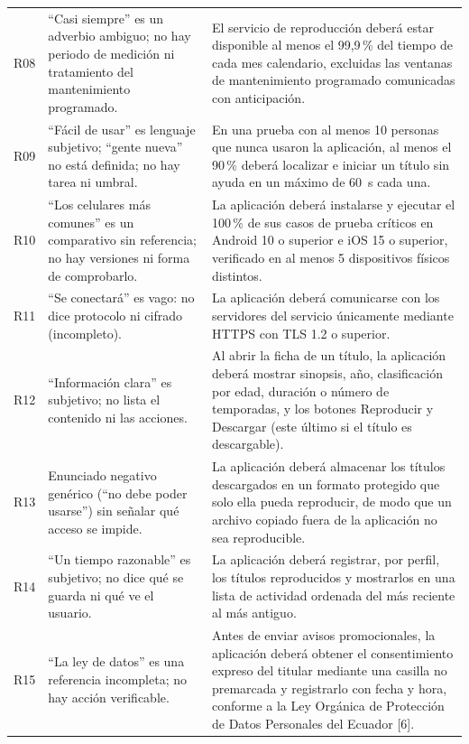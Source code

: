 \documentclass[11pt,a4paper]{article}
\begin{document}
\begin{longtable}{@{}p{0.9cm}p{4.9cm}p{9.4cm}@{}}
R08 & ``Casi siempre'' es un adverbio ambiguo; no hay periodo de medici\'on ni tratamiento del mantenimiento programado. & El servicio de reproducci\'on deber\'a estar disponible al menos el 99,9\,\% del tiempo de cada mes calendario, excluidas las ventanas de mantenimiento programado comunicadas con anticipaci\'on.\\
R09 & ``F\'acil de usar'' es lenguaje subjetivo; ``gente nueva'' no est\'a definida; no hay tarea ni umbral. & En una prueba con al menos 10 personas que nunca usaron la aplicaci\'on, al menos el 90\,\% deber\'a localizar e iniciar un t\'itulo sin ayuda en un m\'aximo de 60~s cada una.\\
R10 & ``Los celulares m\'as comunes'' es un comparativo sin referencia; no hay versiones ni forma de comprobarlo. & La aplicaci\'on deber\'a instalarse y ejecutar el 100\,\% de sus casos de prueba cr\'iticos en Android 10 o superior e iOS 15 o superior, verificado en al menos 5 dispositivos f\'isicos distintos.\\
R11 & ``Se conectar\'a'' es vago: no dice protocolo ni cifrado (incompleto). & La aplicaci\'on deber\'a comunicarse con los servidores del servicio \'unicamente mediante HTTPS con TLS 1.2 o superior.\\
R12 & ``Informaci\'on clara'' es subjetivo; no lista el contenido ni las acciones. & Al abrir la ficha de un t\'itulo, la aplicaci\'on deber\'a mostrar sinopsis, a\~no, clasificaci\'on por edad, duraci\'on o n\'umero de temporadas, y los botones Reproducir y Descargar (este \'ultimo si el t\'itulo es descargable).\\
R13 & Enunciado negativo gen\'erico (``no debe poder usarse'') sin se\~nalar qu\'e acceso se impide. & La aplicaci\'on deber\'a almacenar los t\'itulos descargados en un formato protegido que solo ella pueda reproducir, de modo que un archivo copiado fuera de la aplicaci\'on no sea reproducible.\\
R14 & ``Un tiempo razonable'' es subjetivo; no dice qu\'e se guarda ni qu\'e ve el usuario. & La aplicaci\'on deber\'a registrar, por perfil, los t\'itulos reproducidos y mostrarlos en una lista de actividad ordenada del m\'as reciente al m\'as antiguo.\\
R15 & ``La ley de datos'' es una referencia incompleta; no hay acci\'on verificable. & Antes de enviar avisos promocionales, la aplicaci\'on deber\'a obtener el consentimiento expreso del titular mediante una casilla no premarcada y registrarlo con fecha y hora, conforme a la Ley Org\'anica de Protecci\'on de Datos Personales del Ecuador [6].\\
\bottomrule
\end{longtable}
\endgroup
\end{document}
